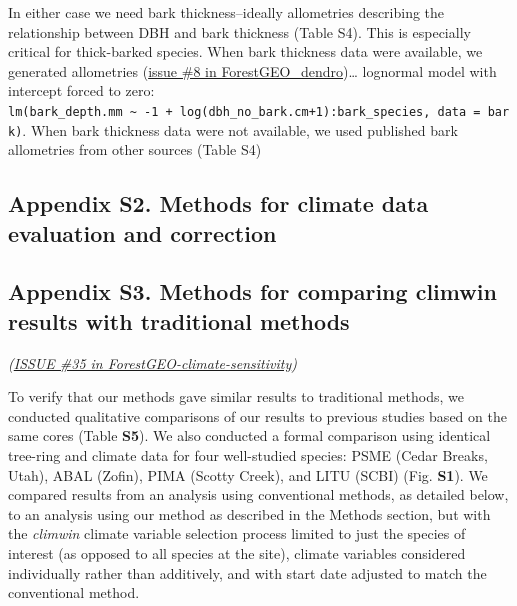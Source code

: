 \documentclass[
]{article}
\begin{document}
In either case we need bark thickness--ideally allometries describing
the relationship between DBH and bark thickness (Table S4). This is
especially critical for thick-barked species. When bark thickness data
were available, we generated allometries
(\href{https://github.com/EcoClimLab/ForestGEO_dendro/issues/8}{issue
\#8 in ForestGEO\_dendro})\ldots{} lognormal model with intercept forced
to zero:
\texttt{lm(bark\_depth.mm\ \textasciitilde{}\ -1\ +\ log(dbh\_no\_bark.cm+1):bark\_species,\ data\ =\ bark)}.
When bark thickness data were not available, we used published bark
allometries from other sources (Table S4)

\newpage

\hypertarget{appendix-s2.-methods-for-climate-data-evaluation-and-correction}{%
\subsection{Appendix S2. Methods for climate data evaluation and
correction}\label{appendix-s2.-methods-for-climate-data-evaluation-and-correction}}

\newpage

\hypertarget{appendix-s3.-methods-for-comparing-climwin-results-with-traditional-methods}{%
\subsection{Appendix S3. Methods for comparing climwin results with
traditional
methods}\label{appendix-s3.-methods-for-comparing-climwin-results-with-traditional-methods}}

\emph{(\href{https://github.com/EcoClimLab/ForestGEO-climate-sensitivity/issues/35}{ISSUE
\#35 in ForestGEO-climate-sensitivity})}

To verify that our methods gave similar results to traditional methods,
we conducted qualitative comparisons of our results to previous studies
based on the same cores (Table \textbf{S5}). We also conducted a formal
comparison using identical tree-ring and climate data for four
well-studied species: PSME (Cedar Breaks, Utah), ABAL (Zofin), PIMA
(Scotty Creek), and LITU (SCBI) (Fig. \textbf{S1}). We compared results
from an analysis using conventional methods, as detailed below, to an
analysis using our method as described in the Methods section, but with
the \emph{climwin} climate variable selection process limited to just
the species of interest (as opposed to all species at the site), climate
variables considered individually rather than additively, and with start
date adjusted to match the conventional method.
\end{document}
